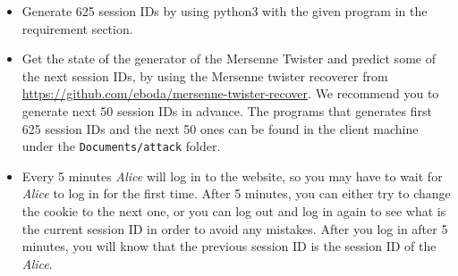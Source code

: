 \documentclass[11pt]{article}
\begin{document}
\begin{itemize}
\item Generate 625 session IDs by using python3 with the given program in the requirement section.
 
\item Get the state of the generator of the Mersenne Twister and predict some of the next session IDs, by using the Mersenne twister recoverer from \url{https://github.com/eboda/mersenne-twister-recover}. We recommend you to generate next 50 session IDs in advance. The programs that generates first 625 session IDs and the next 50 ones can be found in the client machine under the \texttt{Documents/attack} folder.

\item Every 5 minutes \textit{Alice} will log in to the website, so you may have to wait for \textit{Alice} to log in for the first time. After 5 minutes, you can either try to change the cookie to the next one, or you can log out and log in again to see what is the current session ID in order to avoid any mistakes. After you log in after 5 minutes, you will know that the previous session ID is the session ID of the \textit{Alice}.  
 

\end{itemize}
\end{document}
